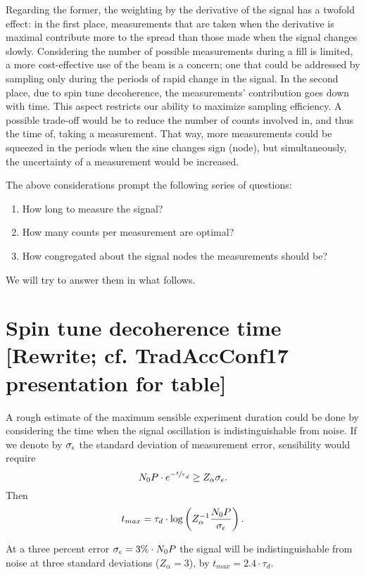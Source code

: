 \documentclass{article}
\begin{document}
Regarding the former, the weighting by the derivative of the signal has a twofold effect: in the first place, measurements that are taken when the derivative is maximal contribute more to the spread than those made when the signal changes slowly. Considering the number of possible measurements during a fill is limited, a more cost-effective use of the beam is a concern; one that could be addressed by sampling only during the periods of rapid change in the signal. In the second place, due to spin tune decoherence, the measurements' contribution goes down with time. This aspect restricts our ability to maximize sampling efficiency. A possible trade-off would be to reduce the number of counts involved in, and thus the time of, taking a measurement. That way, more measurements could be squeezed in the periods when the sine changes sign (node), but simultaneously, the uncertainty of a measurement would be increased. 

The above considerations prompt the following series of questions:
\begin{enumerate}
	\item How long to measure the signal?
	\item How many counts per measurement are optimal?
	\item How congregated about the signal nodes the measurements should be?
\end{enumerate}
We will try to answer them in what follows.

\section{Spin tune decoherence time [Rewrite; cf. TradAccConf17 presentation for table]}
A rough estimate of the maximum sensible experiment duration could be done by considering the time when the signal oscillation is indistinguishable from noise. If we denote by $\SD{\meas}$ the standard deviation of measurement error, sensibility would require
\[
N_0P\cdot e^{-\sfrac t\tau_d} \geq Z_\alpha \SD{\meas}.
\]
Then 
\[
t_{max} = \tau_d\cdot \log\bkt{Z_\alpha^{-1}\frac{N_0P}{\SD{\meas}}}.
\]

At a three percent error $\SD{\meas} = 3\%\cdot N_0P$ the signal will be indistinguishable from noise at three standard deviations ($Z_\alpha = 3$), by $t_{max} = 2.4\cdot \tau_d$. 
\end{document}

